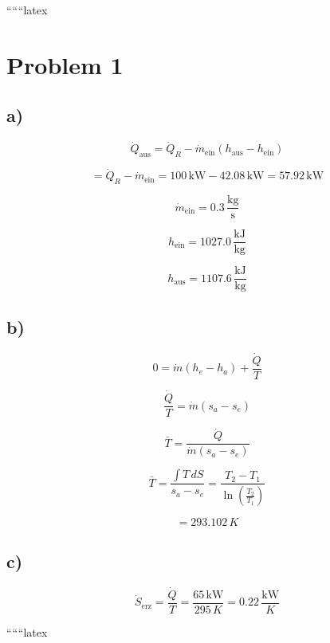 
``````latex

\section*{Problem 1}

\subsection*{a)}

\[
\dot{Q}_{\text{aus}} = \dot{Q}_R - \dot{m}_{\text{ein}} (h_{\text{aus}} - h_{\text{ein}})
\]

\[
= \dot{Q}_R - \dot{m}_{\text{ein}} = 100 \, \text{kW} - 42.08 \, \text{kW} = 57.92 \, \text{kW}
\]

\[
\dot{m}_{\text{ein}} = 0.3 \, \frac{\text{kg}}{\text{s}}
\]

\[
h_{\text{ein}} = 1027.0 \, \frac{\text{kJ}}{\text{kg}}
\]

\[
h_{\text{aus}} = 1107.6 \, \frac{\text{kJ}}{\text{kg}}
\]

\subsection*{b)}

\[
0 = \dot{m} (h_e - h_a) + \frac{\dot{Q}}{T}
\]

\[
\frac{\dot{Q}}{T} = \dot{m} (s_a - s_e)
\]

\[
\bar{T} = \frac{\dot{Q}}{\dot{m} (s_a - s_e)}
\]

\[
\bar{T} = \frac{\int T \, dS}{s_a - s_e} = \frac{T_2 - T_1}{\ln \left( \frac{T_2}{T_1} \right)}
\]

\[
= 293.102 \, K
\]

\subsection*{c)}

\[
\dot{S}_{\text{erz}} = \frac{\dot{Q}}{T} = \frac{65 \, \text{kW}}{295 \, K} = 0.22 \, \frac{\text{kW}}{K}
\]

``````latex


